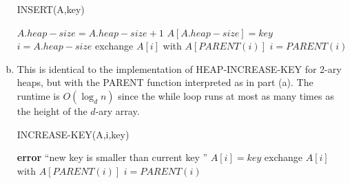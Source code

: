 \documentclass{article}
\begin{document}
\begin{enumerate}[a.]
\begin{algorithm}
\caption{INSERT(A,key)}
\begin{algorithmic}[1]
\State $A.heap-size = A.heap-size + 1$
\State $A[A.heap-size] = key$
\State $i = A.heap-size$
\While{$i > 1$ and $A[PARENT(i) < A[i]$}
	\State exchange $A[i]$ with $A[PARENT(i)]$
	\State $i = PARENT(i)$
\EndWhile
\end{algorithmic}
\end{algorithm}

\item This is identical to the implementation of HEAP-INCREASE-KEY for 2-ary heaps, but with the PARENT function interpreted as in part (a).  The runtime is $O(\log_d n)$ since the while loop runs at most as many times as the height of the $d$-ary array.\\

\begin{algorithm}
\caption{INCREASE-KEY(A,i,key)}
\begin{algorithmic}[1]
	\State \textbf{error} ``new key is smaller than current key ''
\EndIf
\State $A[i] = key$
\While{$i > 1$ and $A[PARENT(i) < A[i]$}
	\State exchange $A[i]$ with $A[PARENT(i)]$
	\State $i = PARENT(i)$
\EndWhile
\end{algorithmic}
\end{algorithm}

\end{enumerate}
\end{document}
